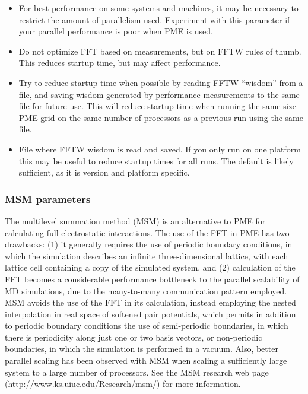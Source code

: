 \begin{itemize}
\item
{}
{For best performance on some systems and machines, it may be necessary to
restrict the amount of parallelism used.  Experiment with this parameter if
your parallel performance is poor when PME is used.}

\item
{}
{Do not optimize FFT based on measurements, but on FFTW rules of thumb.
This reduces startup time, but may affect performance.}

\item
{}
{Try to reduce startup time when possible by reading FFTW ``wisdom'' from a file, and saving wisdom generated by performance measurements to the same file for future use.
This will reduce startup time when running the same size PME grid on the same number of processors as a previous run using the same file.}

\item
{}
{File where FFTW wisdom is read and saved.
If you only run on one platform this may be useful to reduce startup times for all runs.
The default is likely sufficient, as it is version and platform specific.}

\end{itemize}


\subsubsection{MSM parameters}

The multilevel summation method (MSM) 
is an alternative to PME for calculating full electrostatic interactions.
The use of the FFT in PME has two drawbacks:
(1) it generally requires the use of periodic boundary conditions, 
in which the simulation describes an infinite three-dimensional lattice,
with each lattice cell containing a copy of the simulated system, and
(2) calculation of the FFT becomes a considerable performance bottleneck
to the parallel scalability of MD simulations, due to the many-to-many
communication pattern employed.
MSM avoids the use of the FFT in its calculation,
instead employing the nested interpolation in real space
of softened pair potentials, 
which permits in addition to periodic boundary conditions 
the use of
semi-periodic boundaries, in which there is periodicity along 
just one or two basis vectors, 
or non-periodic boundaries, in which the simulation is 
performed in a vacuum. 
Also, better parallel scaling has been observed with MSM 
when scaling a sufficiently large system to a large number of processors. 
See the MSM research web page (http://www.ks.uiuc.edu/Research/msm/) 
for more information. 


